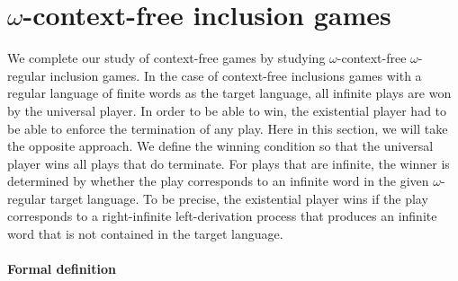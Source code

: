 \documentclass[../../diss.tex]{subfiles}
\begin{document}
\section{\texorpdfstring{$\omega$}{Omega}-context-free inclusion games}%
\label{Section:CFGamesOmega}%

We complete our study of context-free games by studying $\omega$-context-free $\omega$-regular inclusion games.
In the case of context-free inclusions games with a regular language of finite words as the target language, all infinite plays are won by the universal player.
In order to be able to win, the existential player had to be able to enforce the termination of any play.
Here in this section, we will take the opposite approach.
We define the winning condition so that the universal player wins all plays that do terminate.
For plays that are infinite, the winner is determined by whether the play corresponds to an infinite word in the given $\omega$-regular target language.
To be precise, the existential player wins if the play corresponds to a right-infinite left-derivation process that produces an infinite word that is not contained in the target language.

\paragraph{Formal definition}
\end{document}
